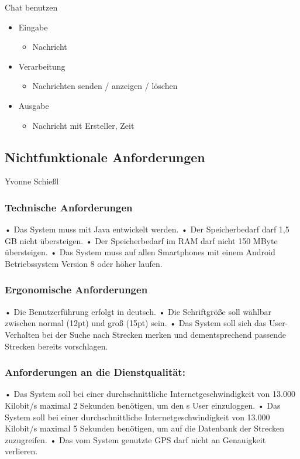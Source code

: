 \documentclass[a4paper, 12pt]{article}
\begin{document}
\bigskip
{\Large Chat benutzen}\\
\begin{itemize}
\item Eingabe
	\begin{itemize}
	\item Nachricht
	\end{itemize}
\item Verarbeitung
	\begin{itemize}
	\item Nachrichten senden / anzeigen / löschen
	\end{itemize}
\item Ausgabe
	\begin{itemize}
	\item Nachricht mit Ersteller, Zeit
	\end{itemize}
\end{itemize}
\subsection{Nichtfunktionale Anforderungen}Yvonne Schießl\\
\subsubsection{Technische Anforderungen}
\label{technAnf}
• Das System muss mit Java entwickelt werden.\newline
• Der Speicherbedarf darf 1,5 GB nicht übersteigen.\newline
• Der Speicherbedarf im RAM darf nicht 150 MByte übersteigen.\newline
• Das System muss auf allen Smartphones mit einem Android Betriebssystem Version 8 oder höher laufen.
\subsubsection{Ergonomische Anforderungen}
• Die Benutzerführung erfolgt in deutsch.\newline
\label{Lesbarkeit}
• Die Schriftgröße soll wählbar zwischen normal (12pt) und groß (15pt) sein.\newline
\label{Vorschlaege}
• Das System soll sich das User-Verhalten bei der Suche nach Strecken merken und dementsprechend passende Strecken bereits vorschlagen.
\subsubsection{Anforderungen an die Dienstqualität:}
\label{Warten}
• Das System soll bei einer durchschnittliche Internetgeschwindigkeit von 13.000 Kilobit/s maximal 2 Sekunden benötigen, um den s User einzuloggen.\newline
• Das System soll bei einer durchschnittliche Internetgeschwindigkeit von 13.000 Kilobit/s maximal 5 Sekunden benötigen, um auf die Datenbank der Strecken zuzugreifen.\newline
• Das vom System genutzte GPS darf nicht an Genauigkeit verlieren.
\end{document}
